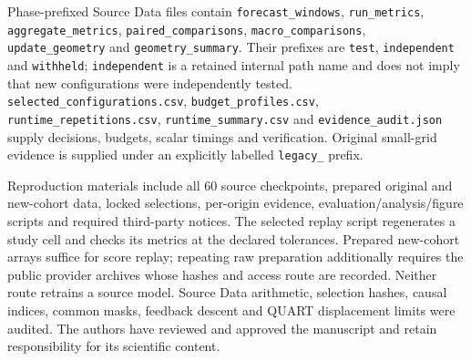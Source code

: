 \documentclass[11pt,a4paper]{article}
\begin{document}
Phase-prefixed Source Data files contain \texttt{forecast\_windows}, \texttt{run\_metrics}, \texttt{aggregate\_metrics}, \texttt{paired\_comparisons}, \texttt{macro\_comparisons}, \texttt{update\_geometry} and \texttt{geometry\_summary}. Their prefixes are \texttt{test}, \texttt{independent} and \texttt{withheld}; \texttt{independent} is a retained internal path name and does not imply that new configurations were independently tested. \texttt{selected\_configurations.csv}, \texttt{budget\_profiles.csv}, \texttt{runtime\_repetitions.csv}, \texttt{runtime\_summary.csv} and \texttt{evidence\_audit.json} supply decisions, budgets, scalar timings and verification. Original small-grid evidence is supplied under an explicitly labelled \texttt{legacy\_} prefix.

Reproduction materials include all 60 source checkpoints, prepared original and new-cohort data, locked selections, per-origin evidence, evaluation/analysis/figure scripts and required third-party notices. The selected replay script regenerates a study cell and checks its metrics at the declared tolerances. Prepared new-cohort arrays suffice for score replay; repeating raw preparation additionally requires the public provider archives whose hashes and access route are recorded. Neither route retrains a source model. Source Data arithmetic, selection hashes, causal indices, common masks, feedback descent and QUART displacement limits were audited. The authors have reviewed and approved the manuscript and retain responsibility for its scientific content.
\end{document}
